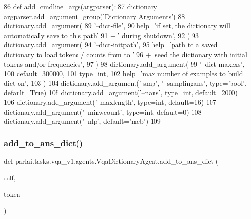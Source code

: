 \begin{DoxyCode}
86     \textcolor{keyword}{def }\hyperlink{namespaceparlai_1_1agents_1_1drqa_1_1config_a62fdd5554f1da6be0cba185271058320}{add\_cmdline\_args}(argparser):
87         dictionary = argparser.add\_argument\_group(\textcolor{stringliteral}{'Dictionary Arguments'})
88         dictionary.add\_argument(
89             \textcolor{stringliteral}{'--dict-file'},
90             help=\textcolor{stringliteral}{'if set, the dictionary will automatically save to this path'}
91             + \textcolor{stringliteral}{' during shutdown'},
92         )
93         dictionary.add\_argument(
94             \textcolor{stringliteral}{'--dict-initpath'},
95             help=\textcolor{stringliteral}{'path to a saved dictionary to load tokens / counts from to '}
96             + \textcolor{stringliteral}{'seed the dictionary with initial tokens and/or frequencies'},
97         )
98         dictionary.add\_argument(
99             \textcolor{stringliteral}{'--dict-maxexs'},
100             default=300000,
101             type=int,
102             help=\textcolor{stringliteral}{'max number of examples to build dict on'},
103         )
104         dictionary.add\_argument(\textcolor{stringliteral}{'-smp'}, \textcolor{stringliteral}{'--samplingans'}, type=\textcolor{stringliteral}{'bool'}, default=\textcolor{keyword}{True})
105         dictionary.add\_argument(\textcolor{stringliteral}{'--nans'}, type=int, default=2000)
106         dictionary.add\_argument(\textcolor{stringliteral}{'--maxlength'}, type=int, default=16)
107         dictionary.add\_argument(\textcolor{stringliteral}{'--minwcount'}, type=int, default=0)
108         dictionary.add\_argument(\textcolor{stringliteral}{'--nlp'}, default=\textcolor{stringliteral}{'mcb'})
109 
\end{DoxyCode}
\mbox{\label{classparlai_1_1tasks_1_1vqa__v1_1_1agents_1_1VqaDictionaryAgent_a5a69f09a3f7a908c3e89f9b0b86f7396}} 
\subsubsection{\texorpdfstring{add\+\_\+to\+\_\+ans\+\_\+dict()}{add\_to\_ans\_dict()}}
{\footnotesize\ttfamily def parlai.\+tasks.\+vqa\+\_\+v1.\+agents.\+Vqa\+Dictionary\+Agent.\+add\+\_\+to\+\_\+ans\+\_\+dict (\begin{DoxyParamCaption}\item[{}]{self,  }\item[{}]{token }\end{DoxyParamCaption})}


